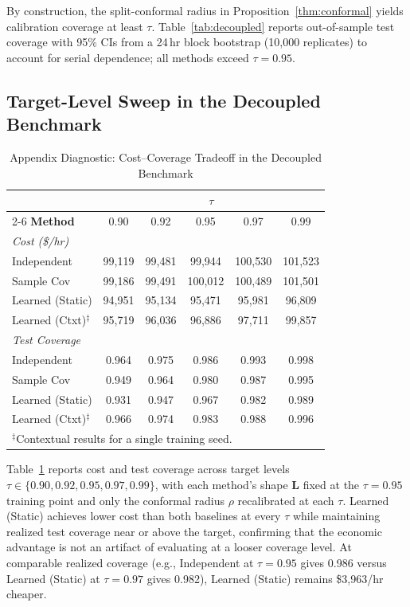 \documentclass[11pt]{article}
\newcommand{\bL}{\bm{L}}
\theoremstyle{definition}
\begin{document}
By construction, the split-conformal radius in Proposition~\ref{thm:conformal} yields calibration coverage at least $\tau$. Table~\ref{tab:decoupled} reports out-of-sample test coverage with 95\% CIs from a 24\,hr block bootstrap (10{,}000 replicates) to account for serial dependence; all methods exceed $\tau = 0.95$.

\subsection{Target-Level Sweep in the Decoupled Benchmark}

\begin{table}[!t]
\caption{Appendix Diagnostic: Cost--Coverage Tradeoff in the Decoupled Benchmark}
\label{tab:tau-sweep}
\centering
\begin{tabular}{lccccc}
\toprule
& \multicolumn{5}{c}{$\tau$} \\
\cmidrule(lr){2-6}
\textbf{Method} & 0.90 & 0.92 & 0.95 & 0.97 & 0.99 \\
\midrule
\multicolumn{6}{l}{\textit{Cost (\$/hr)}} \\
Independent & 99{,}119 & 99{,}481 & 99{,}944 & 100{,}530 & 101{,}523 \\
Sample Cov & 99{,}186 & 99{,}491 & 100{,}012 & 100{,}489 & 101{,}501 \\
Learned (Static) & 94{,}951 & 95{,}134 & 95{,}471 & 95{,}981 & 96{,}809 \\
Learned (Ctxt)$^\ddagger$ & 95{,}719 & 96{,}036 & 96{,}886 & 97{,}711 & 99{,}857 \\
\midrule
\multicolumn{6}{l}{\textit{Test Coverage}} \\
Independent & 0.964 & 0.975 & 0.986 & 0.993 & 0.998 \\
Sample Cov & 0.949 & 0.964 & 0.980 & 0.987 & 0.995 \\
Learned (Static) & 0.931 & 0.947 & 0.967 & 0.982 & 0.989 \\
Learned (Ctxt)$^\ddagger$ & 0.966 & 0.974 & 0.983 & 0.988 & 0.996 \\
\bottomrule
\multicolumn{6}{l}{\footnotesize $^\ddagger$Contextual results for a single training seed.}
\end{tabular}
\end{table}

Table~\ref{tab:tau-sweep} reports cost and test coverage across target levels $\tau \in \{0.90, 0.92, 0.95, 0.97, 0.99\}$, with each method's shape $\bL$ fixed at the $\tau = 0.95$ training point and only the conformal radius $\rho$ recalibrated at each $\tau$. Learned (Static) achieves lower cost than both baselines at every $\tau$ while maintaining realized test coverage near or above the target, confirming that the economic advantage is not an artifact of evaluating at a looser coverage level. At comparable realized coverage (e.g., Independent at $\tau = 0.95$ gives 0.986 versus Learned (Static) at $\tau = 0.97$ gives 0.982), Learned (Static) remains \$3{,}963/hr cheaper.
\end{document}
